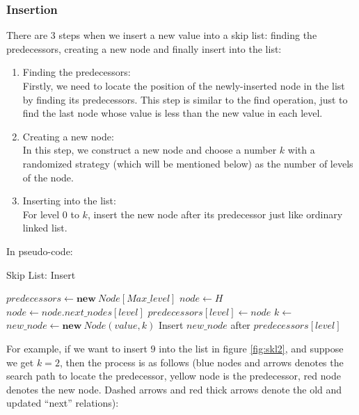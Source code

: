 \subsubsection{Insertion}
There are 3 steps when we insert a new value into a skip list: finding the predecessors, creating a new node and finally insert into the list:
\begin{enumerate}
    \item Finding the predecessors:\\
          Firstly, we need to locate the position of the newly-inserted node in the list by finding its predecessors. This step is similar to the find operation, just to find the last node whose value is less than the new value in each level.
    \item Creating a new node:\\
          In this step, we construct a new node and choose a number $k$ with a randomized strategy (which will be mentioned below) as the number of levels of the node.
    \item Inserting into the list:\\
          For level $0$ to $k$, insert the new node after its predecessor just like ordinary linked list.
\end{enumerate}
In pseudo-code:
\begin{algorithm}[H]
    \caption{Skip List: Insert}
    \begin{algorithmic}[1]
            \State $predecessors \gets \mathbf{new}\ Node[Max\_level]$
            \State $node \gets H$
                    \State $node \gets node.next\_nodes[level]$
                \EndWhile
                \State $predecessors[level] \gets node$
            \EndFor
            \State$k \gets$ 
            \State $new\_node \gets \mathbf{new}\ Node(value, k)$
                \State Insert $new\_node$ after $predecessors[level]$
            \EndFor
		\EndProcedure
	\end{algorithmic}
\end{algorithm}
For example, if we want to insert $9$ into the list in figure \ref{fig:skl2}, and suppose we get $k=2$, then the process is as follows (blue nodes and arrows denotes the search path to locate the predecessor, yellow node is the predecessor, red node denotes the new node. Dashed arrows and red thick arrows denote the old and updated ``next'' relations):

